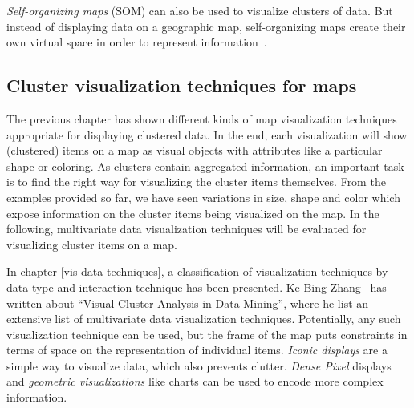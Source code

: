 \textit{Self-organizing maps} (SOM) can also be used to visualize clusters of data. But instead of displaying data on a geographic map, self-organizing maps create their own virtual space in order to represent information~\cite{noellenburg11geovis}.  


\subsection{Cluster visualization techniques for maps}
\label{chapter:cluster-vis}

The previous chapter has shown different kinds of map visualization techniques appropriate for displaying clustered data. In the end, each visualization will show (clustered) items on a map as visual objects with attributes like a particular shape or coloring. As clusters contain aggregated information, an important task is to find the right way for visualizing the cluster items themselves. From the examples provided so far, we have seen variations in size, shape and color which expose information on the cluster items being visualized on the map. In the following, multivariate data visualization techniques will be evaluated for visualizing cluster items on a map.

In chapter \ref{vis-data-techniques}, a classification of visualization techniques by data type and interaction technique has been presented. Ke-Bing Zhang~\cite{zhang07thesis} has written about ``Visual Cluster Analysis in Data Mining'', where he list an extensive list of multivariate data visualization techniques. Potentially, any such visualization technique can be used, but the frame of the map puts constraints in terms of space on the representation of individual items. \textit{Iconic displays} are a simple way to visualize data, which also prevents clutter. \textit{Dense Pixel} displays and \textit{geometric visualizations} like charts can be used to encode more complex information.

